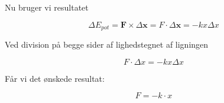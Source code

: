 Nu bruger vi resultatet 

\bigskip

\begin{equation}
\Delta E_{pot} = \textbf{F} \times \Delta \textbf{x} = F \cdot \Delta \textbf{x} = -kx \Delta x
\end{equation}

\bigskip

Ved division på begge sider af lighedstegnet af ligningen 

\bigskip

\begin{equation}
F \cdot \Delta x = -kx \Delta x
\end{equation}

\bigskip

Får vi det ønskede resultat: 

\bigskip

\begin{equation}
F = -k \cdot x
\end{equation}